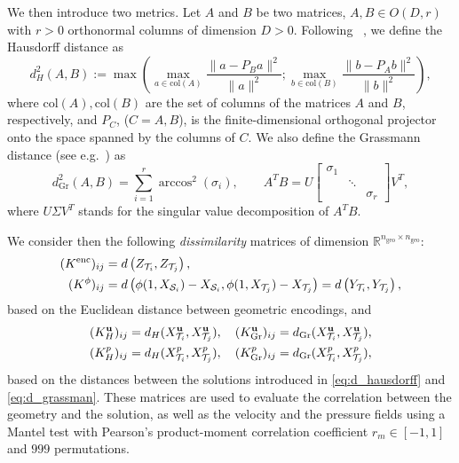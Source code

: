 We then introduce two metrics. Let $A$ and $B$ be two matrices, $A, B \in O(D, r)$  with $r>0$ orthonormal columns of dimension $D>0$. 
Following ~\cite{galarce2022state}, we define the Hausdorff distance as
\begin{equation}\label{eq:d_hausdorff}
 d_H^2(A, B) := \max\left(\max_{a\in \text{col}(A)} \frac{\lVert a-P_{B}a\rVert^2}{\lVert a\rVert^2};\max_{b\in \text{col}(B)} \frac{\lVert b-P_{A}b\rVert^2}{\lVert b\rVert^2}\right),
\end{equation}
where $\text{col}(A), \text{col}(B)$ are the set of columns of the matrices $A$ and $B$, respectively, 
and $P_C$, ($C=A,B$), is the finite-dimensional orthogonal projector onto the space spanned by the columns of $C$.
%
We also define the Grassmann distance (see e.g.~\cite{daniel2020model}) as
\begin{equation}\label{eq:d_grassman}
  d_{\text{Gr}}^2(A, B) = \sum^{r}_{i=1}\arccos^2(\sigma_i),\qquad A^TB = %
  U\begin{bmatrix}
    \sigma_{1} & & \\
    & \ddots & \\
    & & \sigma_{r}
  \end{bmatrix}V^T,
\end{equation}
where $U\Sigma V^T$ stands for the singular value decomposition of $A^TB$. 


We consider then the following \textit{dissimilarity} matrices of dimension $\mathbb{R}^{n_{\text{geo}}\times n_{\text{geo}}}$:
\begin{equation}\label{eq:geo_matrices}
\begin{aligned}
(K^{\text{enc}})_{ij} & = d\left(Z_{\mathcal T_{i}}, Z_{\mathcal T_{j}}\right), \\
(K^{\phi})_{ij} & = d\left(\phi(1, X_{\mathcal S_i})-X_{\mathcal S_i}, \phi(1, X_{\mathcal T_{j}})-X_{\mathcal T_{j}}\right) = d\left(Y_{\mathcal T_{i}}, Y_{\mathcal T_{j}}\right), \\
\end{aligned}
\end{equation}
based on the Euclidean distance between geometric encodings, and 
\begin{equation}\label{eq:up_matrices}
\begin{aligned}
(K_{H}^{\mathbf u})_{ij} & = d_H(X_{\mathcal T_{i}}^{\mathbf u}, X_{\mathcal T_{j}}^{\mathbf u}),
\quad(K_{{\rm Gr}}^{\mathbf u})_{ij} = d_{\rm Gr}(X_{\mathcal T_{i}}^{\mathbf u}, X_{\mathcal T_{j}}^{\mathbf u}),\\
(K_{H}^{p})_{ij} & = d_H(X^p_{\mathcal T_{i}}, X^p_{\mathcal T_{j}}),
\quad(K_{{\rm Gr}}^{p})_{ij} = d_{\rm Gr}(X^p_{\mathcal T_{i}}, X^p_{\mathcal T_{j}}),
\end{aligned}
\end{equation}
based on the distances between the solutions introduced in \eqref{eq:d_hausdorff} and \eqref{eq:d_grassman}.
%
These matrices are used to evaluate the correlation between the geometry and the solution, as well as the velocity and the pressure fields using a Mantel test with 
Pearson’s product-moment correlation coefficient $r_m\in[-1, 1]$ and $999$ permutations.

